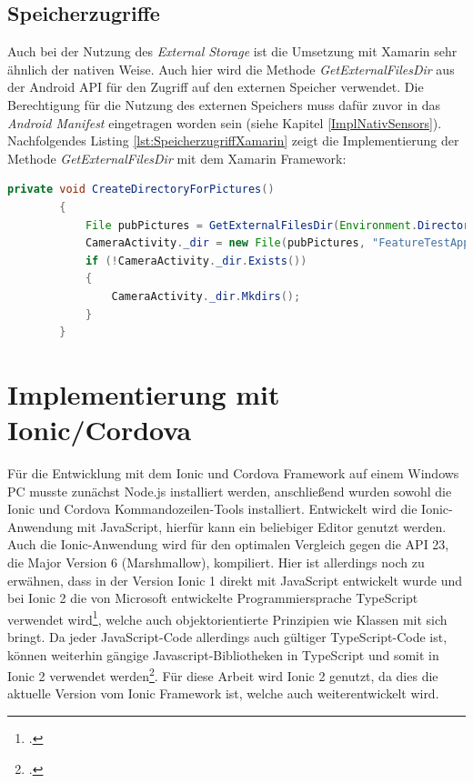 \subsection*{Speicherzugriffe}

Auch bei der Nutzung des \textit{External Storage} ist die Umsetzung mit Xamarin sehr ähnlich der nativen Weise. Auch hier wird die Methode \textit{GetExternalFilesDir} aus der Android API für den Zugriff auf den externen Speicher verwendet. Die Berechtigung für die Nutzung des externen Speichers muss dafür zuvor in das \textit{Android Manifest} eingetragen worden sein (siehe Kapitel \ref{ImplNativSensors}). Nachfolgendes Listing \ref{lst:SpeicherzugriffXamarin} zeigt die Implementierung der Methode \textit{GetExternalFilesDir} mit dem Xamarin Framework:

\begin{lstlisting}[caption=Methode \textit{GetExternalFilesDir()}: Adressieren des 'External Storage' und Anlegen eines Ordners für die Fotos der Funktionstest-Anwendung, label=lst:SpeicherzugriffXamarin, language=Java]
private void CreateDirectoryForPictures()
        {
            File pubPictures = GetExternalFilesDir(Environment.DirectoryPictures);
            CameraActivity._dir = new File(pubPictures, "FeatureTestAppXamarin");
            if (!CameraActivity._dir.Exists())
            {
                CameraActivity._dir.Mkdirs();
            }
        }
\end{lstlisting}

\section{Implementierung mit Ionic/Cordova}

Für die Entwicklung mit dem Ionic und Cordova Framework auf einem Windows PC musste zunächst Node.js installiert werden, anschließend wurden sowohl die Ionic und Cordova Kommandozeilen-Tools installiert. Entwickelt wird die Ionic-Anwendung mit JavaScript, hierfür kann ein beliebiger Editor genutzt werden. Auch die Ionic-Anwendung wird für den optimalen Vergleich gegen die API 23, die Major Version 6 (Marshmallow), kompiliert. Hier ist allerdings noch zu erwähnen, dass in der Version Ionic 1 direkt mit JavaScript entwickelt wurde und bei Ionic 2 die von Microsoft entwickelte Programmiersprache TypeScript verwendet wird\footcite{Ionic}, welche auch objektorientierte Prinzipien wie Klassen mit sich bringt. Da jeder JavaScript-Code allerdings auch gültiger TypeScript-Code ist, können weiterhin gängige Javascript-Bibliotheken in TypeScript und somit in Ionic 2 verwendet werden\footcite{TypeScript}. Für diese Arbeit wird Ionic 2 genutzt, da dies die aktuelle Version vom Ionic Framework ist, welche auch weiterentwickelt wird.

